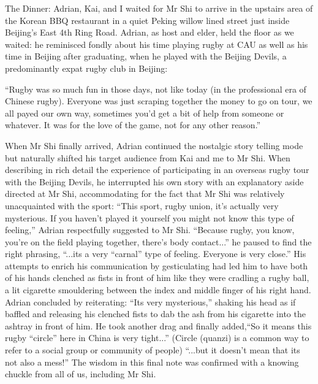 The Dinner:
Adrian, Kai, and I waited for Mr Shi to arrive in the upstairs area of the Korean BBQ restaurant in a quiet Peking willow lined street just inside Beijing's East 4th Ring Road.  Adrian, as host and elder, held the floor as we waited: he reminisced fondly about his time playing rugby at CAU as well as his time in Beijing after graduating, when he played with the Beijing Devils, a predominantly expat rugby club in Beijing:

  ``Rugby was so much fun in those days, not like today (in the professional era of Chinese rugby).  Everyone was just scraping together the money to go on tour, we all payed our own way, sometimes you'd get a bit of help from someone or whatever. It was for the love of the game, not for any other reason.''

When Mr Shi finally arrived, Adrian continued the nostalgic story telling mode but naturally shifted his target audience from Kai and me to Mr Shi.  When describing in rich detail the experience of participating in an overseas rugby tour with the Beijing Devils, he interrupted his own story with an explanatory aside directed at Mr Shi, accommodating for the fact that Mr Shi was relatively unacquainted with the sport: ``This sport, rugby union, it's actually very mysterious. If you haven't played it yourself you might not know this type of feeling,'' Adrian respectfully suggested to Mr Shi. ``Because rugby, you know, you're on the field playing together, there's body contact...'' he paused to find the right phrasing,  ``...its a very ``carnal'' type of feeling. Everyone is very close.'' His attempts to enrich his communication by gesticulating had led him to have both of his hands clenched as fists in front of him like they were cradling a rugby ball, a lit cigarette smouldering between the index and middle finger of his right hand.  Adrian concluded by reiterating: ``Its very mysterious,'' shaking his head as if baffled and releasing his clenched fists to dab the ash from his cigarette into the ashtray in front of him. He took another drag and  finally added,``So it means this rugby ``circle'' here in China is very tight...'' (Circle (quanzi) is a common way to refer to a social group or community of people) ``...but it doesn't mean that its not also a mess!'' The wisdom in this final note was confirmed with a knowing chuckle from all of us, including Mr Shi.



